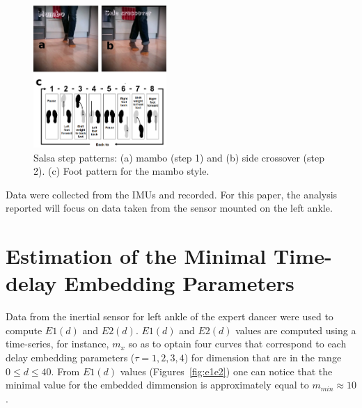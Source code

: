 \documentclass{sigchi}
\begin{document}
\begin{figure}[!htb]
\centering    
\includegraphics[width=0.45\textwidth]{steps}
\caption[PA]{Salsa step patterns: (a) mambo (step 1) and (b) side crossover (step 2). 
(c) Foot pattern for the mambo style. }
\label{fig:steps}
\end{figure}


Data were collected from the IMUs and recorded.  
For this paper, the analysis reported will focus on data taken from the sensor mounted on the left ankle. 






\section{Estimation of the Minimal Time-delay Embedding Parameters}
Data from the inertial sensor for left ankle of the expert dancer were used to compute $E1(d)$ and $E2(d)$. 
$E1(d)$ and $E2(d)$ values are computed using a time-series, for instance, $m_x$
so as to optain four curves that correspond to each delay embedding parameters ($\tau=1,2,3,4$)
for dimension that are in the range $0 \leq d \leq 40$.
From $E1(d)$ values (Figures~\ref{fig:e1e2})
one can notice that the minimal value for the embedded dimmension is approximately
equal to $m_{min} \approx 10$. 
  
\end{document}
